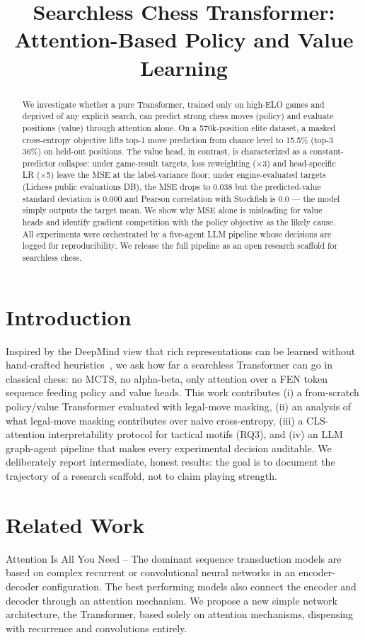 \documentclass[conference,onecolumn]{IEEEtran}
\begin{document}
\title{Searchless Chess Transformer: Attention-Based Policy and Value Learning}
\maketitle
\begin{abstract}We investigate whether a pure Transformer, trained only on high-ELO games and deprived of any explicit search, can predict strong chess moves (policy) and evaluate positions (value) through attention alone. On a 570k-position elite dataset, a masked cross-entropy objective lifts top-1 move prediction from chance level to 15.5\% (top-3 36\%) on held-out positions. The value head, in contrast, is characterized as a constant-predictor collapse: under game-result targets, loss reweighting ($\times$3) and head-specific LR ($\times$5) leave the MSE at the label-variance floor; under engine-evaluated targets (Lichess public evaluations DB), the MSE drops to 0.038 but the predicted-value standard deviation is 0.000 and Pearson correlation with Stockfish is 0.0 --- the model simply outputs the target mean. We show why MSE alone is misleading for value heads and identify gradient competition with the policy objective as the likely cause. All experiments were orchestrated by a five-agent LLM pipeline whose decisions are logged for reproducibility. We release the full pipeline as an open research scaffold for searchless chess.\end{abstract}
\section{Introduction}
Inspired by the DeepMind view that rich representations can be learned without hand-crafted heuristics~\cite{Silver2017_1712_01815}, we ask how far a searchless Transformer can go in classical chess: no MCTS, no alpha-beta, only attention over a FEN token sequence feeding policy and value heads. This work contributes (i) a from-scratch policy/value Transformer evaluated with legal-move masking, (ii) an analysis of what legal-move masking contributes over naive cross-entropy, (iii) a CLS-attention interpretability protocol for tactical motifs (RQ3), and (iv) an LLM graph-agent pipeline that makes every experimental decision auditable. We deliberately report intermediate, honest results: the goal is to document the trajectory of a research scaffold, not to claim playing strength.
\section{Related Work}
\cite{Vaswani2017_1706_03762} Attention Is All You Need -- The dominant sequence transduction models are based on complex recurrent or convolutional neural networks in an encoder-decoder configuration. The best performing models also connect the encoder and decoder through an attention mechanism. We propose a new simple network architecture, the Transformer, based solely on attention mechanisms, dispensing with recurrence and convolutions entirely.
\end{document}
